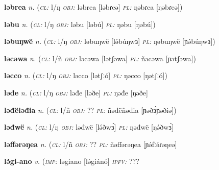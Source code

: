 	
\newentry
\headword\textbf{ləbrea}  
\ipa{[ləbɾeə]}
\synpos\textit{n.} 
\class(\textit{\textsc{cl:}} {l/ŋ}
\object\textit{\textsc{obj:}} ləbrea [ləbɾeə]
\plural\textit{\textsc{pl:}} ŋəbɾea [ŋəbɾeə])

\newentry
\headword\textbf{ləbu}  
\ipa{[ləbú]}
\synpos\textit{n.} 
\class(\textit{\textsc{cl:}} {l/ŋ}
\object\textit{\textsc{obj:}} ləbu [ləbú]
\plural\textit{\textsc{pl:}} ŋəbu [ŋəbú])

\newentry
\headword\textbf{ləbuŋwë}  
\ipa{[lə́búŋwɜ]}
\synpos\textit{n.} 
\class(\textit{\textsc{cl:}} {l/ŋ}
\object\textit{\textsc{obj:}} ləbuŋwë [lə́búŋwɜ]
\plural\textit{\textsc{pl:}} ŋəbuŋwë [ɲə́búŋwɜ])

\newentry
\headword\textbf{ləcəwa} 
\ipa{[lətʃəwa]}
\synpos\textit{n.} 
\class(\textit{\textsc{cl:}} {l/ñ}
\object\textit{\textsc{obj:}} ləcəwa [lətʃəwa]
\plural\textit{\textsc{pl:}} ñəcəwa [ɲətʃəwa])

\newentry
\headword\textbf{ləcco} 
\ipa{[lətʃːó]}
\synpos\textit{n.} 
\class(\textit{\textsc{cl:}} {l/ŋ}
\object\textit{\textsc{obj:}} ləcco [lətʃːó]
\plural\textit{\textsc{pl:}} ŋəcco [ŋətʃːó])

\newentry
\headword\textbf{ləđe} 
\ipa{[ləðe]}
\synpos\textit{n.} 
\class(\textit{\textsc{cl:}} {l/ŋ}
\object\textit{\textsc{obj:}} ləđe [ləðe]
\plural\textit{\textsc{pl:}} ŋəđe [ŋəðe]


\newentry
\headword\textbf{ləđëləđia}  
\synpos\textit{n.} 
\class(\textit{\textsc{cl:}} {l/ñ}
\object\textit{\textsc{obj:}} ??
\plural\textit{\textsc{pl:}} ñəđëñəđia [ɲəðɜ́ɲəðiə])

\newentry
\headword\textbf{ləđwë} 
\ipa{[lə́ðwɜ́]}
\synpos\textit{n.} 
\class(\textit{\textsc{cl:}} {l/ŋ}
\object\textit{\textsc{obj:}} ləđwë [lə́ðwɜ́]
\plural\textit{\textsc{pl:}} ŋəđwë [ŋə́ðwɜ́]


\newentry
\headword\textbf{ləffərəŋea} 
\synpos\textit{n.} 
\class(\textit{\textsc{cl:}} {l/ñ}
\object\textit{\textsc{obj:}} ??
\plural\textit{\textsc{pl:}} ñəffərəŋea [ɲə́fːə́ɾəŋeə]


\newentry
\headword\textbf{lə́gi-ano}  
\ipa{[lə́gi-áno]}
\synpos\textit{v.} 
\imperative(\textit {\textsc{imp:}} ləgiano [lə́giánó]  
\imperfective\textit{\textsc{ipfv:}} ??? %

